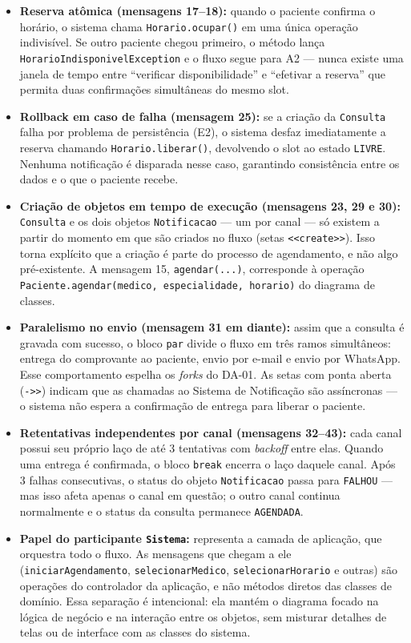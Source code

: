 \documentclass[12pt,a4paper]{article}
\providecommand{\tightlist}{%
  \setlength{\itemsep}{0pt}\setlength{\parskip}{0pt}}
\begin{document}
\begin{itemize}
\tightlist
\item
  \textbf{Reserva atômica (mensagens 17--18):} quando o paciente
  confirma o horário, o sistema chama \texttt{Horario.ocupar()} em uma
  única operação indivisível. Se outro paciente chegou primeiro, o
  método lança \texttt{HorarioIndisponivelException} e o fluxo segue
  para A2 --- nunca existe uma janela de tempo entre ``verificar
  disponibilidade'' e ``efetivar a reserva'' que permita duas
  confirmações simultâneas do mesmo slot.
\item
  \textbf{Rollback em caso de falha (mensagem 25):} se a criação da
  \texttt{Consulta} falha por problema de persistência (E2), o sistema
  desfaz imediatamente a reserva chamando \texttt{Horario.liberar()},
  devolvendo o slot ao estado \texttt{LIVRE}. Nenhuma notificação é
  disparada nesse caso, garantindo consistência entre os dados e o que o
  paciente recebe.
\item
  \textbf{Criação de objetos em tempo de execução (mensagens 23, 29 e
  30):} \texttt{Consulta} e os dois objetos \texttt{Notificacao} --- um
  por canal --- só existem a partir do momento em que são criados no
  fluxo (setas \texttt{<{}<create>{}>}). Isso torna explícito que a
  criação é parte do processo de agendamento, e não algo pré-existente.
  A mensagem 15, \texttt{agendar(...)}, corresponde à operação
  \texttt{Paciente.agendar(medico, especialidade, horario)} do diagrama
  de classes.
\item
  \textbf{Paralelismo no envio (mensagem 31 em diante):} assim que a
  consulta é gravada com sucesso, o bloco \texttt{par} divide o fluxo em
  três ramos simultâneos: entrega do comprovante ao paciente, envio por
  e-mail e envio por WhatsApp. Esse comportamento espelha os
  \emph{forks} do DA-01. As setas com ponta aberta
  (\texttt{-{}>{}>}) indicam que as chamadas ao Sistema de Notificação
  são assíncronas --- o sistema não espera a confirmação de entrega para
  liberar o paciente.
\item
  \textbf{Retentativas independentes por canal (mensagens 32--43):}
  cada canal possui seu próprio laço de até 3 tentativas com
  \emph{backoff} entre elas. Quando uma entrega é confirmada, o bloco
  \texttt{break} encerra o laço daquele canal. Após 3 falhas
  consecutivas, o status do objeto \texttt{Notificacao} passa para
  \texttt{FALHOU} --- mas isso afeta apenas o canal em questão; o outro
  canal continua normalmente e o status da consulta permanece
  \texttt{AGENDADA}.
\item
  \textbf{Papel do participante \texttt{Sistema}:} representa a camada
  de aplicação, que orquestra todo o fluxo. As mensagens que chegam a
  ele (\texttt{iniciarAgendamento}, \texttt{selecionarMedico},
  \texttt{selecionarHorario} e outras) são operações do controlador da
  aplicação, e não métodos diretos das classes de domínio. Essa
  separação é intencional: ela mantém o diagrama focado na lógica de
  negócio e na interação entre os objetos, sem misturar detalhes de
  telas ou de interface com as classes do sistema.
\end{itemize}
\end{document}

